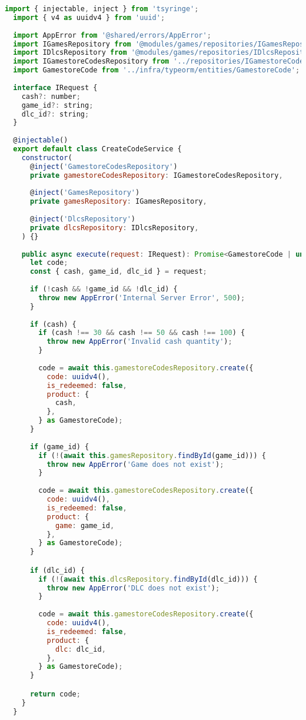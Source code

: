 \begin{lstlisting}[language=JavaScript, caption={Implementação que viola o OCP},captionpos=b, label=alg:ocpviolation]
  import { injectable, inject } from 'tsyringe';
  import { v4 as uuidv4 } from 'uuid';
  
  import AppError from '@shared/errors/AppError';
  import IGamesRepository from '@modules/games/repositories/IGamesRepository';
  import IDlcsRepository from '@modules/games/repositories/IDlcsRepository';
  import IGamestoreCodesRepository from '../repositories/IGamestoreCodeRepository';
  import GamestoreCode from '../infra/typeorm/entities/GamestoreCode';
  
  interface IRequest {
    cash?: number;
    game_id?: string;
    dlc_id?: string;
  }
  
  @injectable()
  export default class CreateCodeService {
    constructor(
      @inject('GamestoreCodesRepository')
      private gamestoreCodesRepository: IGamestoreCodesRepository,
  
      @inject('GamesRepository')
      private gamesRepository: IGamesRepository,
  
      @inject('DlcsRepository')
      private dlcsRepository: IDlcsRepository,
    ) {}
  
    public async execute(request: IRequest): Promise<GamestoreCode | undefined> {
      let code;
      const { cash, game_id, dlc_id } = request;
  
      if (!cash && !game_id && !dlc_id) {
        throw new AppError('Internal Server Error', 500);
      }
  
      if (cash) {
        if (cash !== 30 && cash !== 50 && cash !== 100) {
          throw new AppError('Invalid cash quantity');
        }
  
        code = await this.gamestoreCodesRepository.create({
          code: uuidv4(),
          is_redeemed: false,
          product: {
            cash,
          },
        } as GamestoreCode);
      }
  
      if (game_id) {
        if (!(await this.gamesRepository.findById(game_id))) {
          throw new AppError('Game does not exist');
        }
  
        code = await this.gamestoreCodesRepository.create({
          code: uuidv4(),
          is_redeemed: false,
          product: {
            game: game_id,
          },
        } as GamestoreCode);
      }

      if (dlc_id) {
        if (!(await this.dlcsRepository.findById(dlc_id))) {
          throw new AppError('DLC does not exist');
        }
  
        code = await this.gamestoreCodesRepository.create({
          code: uuidv4(),
          is_redeemed: false,
          product: {
            dlc: dlc_id,
          },
        } as GamestoreCode);
      }

      return code;
    }
  }
  
  \end{lstlisting}